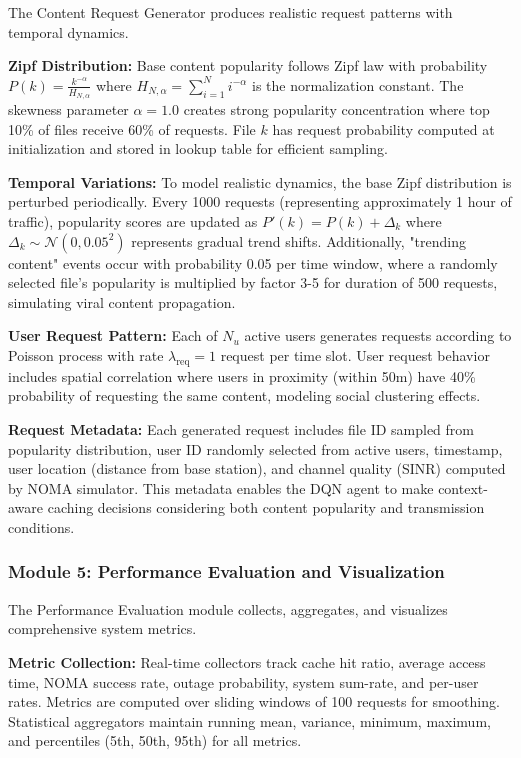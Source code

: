 \documentclass[12pt,a4paper]{article}
\begin{document}
The Content Request Generator produces realistic request patterns with temporal dynamics.

\textbf{Zipf Distribution:} Base content popularity follows Zipf law with probability $P(k) = \frac{k^{-\alpha}}{H_{N,\alpha}}$ where $H_{N,\alpha} = \sum_{i=1}^N i^{-\alpha}$ is the normalization constant. The skewness parameter $\alpha = 1.0$ creates strong popularity concentration where top 10\% of files receive 60\% of requests. File $k$ has request probability computed at initialization and stored in lookup table for efficient sampling.

\textbf{Temporal Variations:} To model realistic dynamics, the base Zipf distribution is perturbed periodically. Every 1000 requests (representing approximately 1 hour of traffic), popularity scores are updated as $P'(k) = P(k) + \Delta_k$ where $\Delta_k \sim \mathcal{N}(0, 0.05^2)$ represents gradual trend shifts. Additionally, "trending content" events occur with probability 0.05 per time window, where a randomly selected file's popularity is multiplied by factor 3-5 for duration of 500 requests, simulating viral content propagation.

\textbf{User Request Pattern:} Each of $N_u$ active users generates requests according to Poisson process with rate $\lambda_{\text{req}} = 1$ request per time slot. User request behavior includes spatial correlation where users in proximity (within 50m) have 40\% probability of requesting the same content, modeling social clustering effects.

\textbf{Request Metadata:} Each generated request includes file ID sampled from popularity distribution, user ID randomly selected from active users, timestamp, user location (distance from base station), and channel quality (SINR) computed by NOMA simulator. This metadata enables the DQN agent to make context-aware caching decisions considering both content popularity and transmission conditions.

\subsubsection{Module 5: Performance Evaluation and Visualization}

The Performance Evaluation module collects, aggregates, and visualizes comprehensive system metrics.

\textbf{Metric Collection:} Real-time collectors track cache hit ratio, average access time, NOMA success rate, outage probability, system sum-rate, and per-user rates. Metrics are computed over sliding windows of 100 requests for smoothing. Statistical aggregators maintain running mean, variance, minimum, maximum, and percentiles (5th, 50th, 95th) for all metrics.
\end{document}
